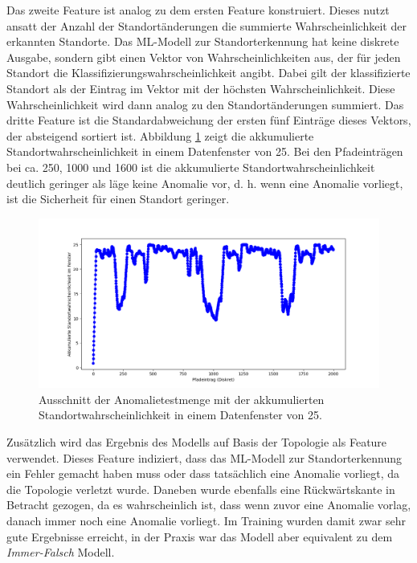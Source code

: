 \newline
\newline
Das zweite Feature ist analog zu dem ersten Feature konstruiert.
Dieses nutzt ansatt der Anzahl der Standortänderungen die summierte Wahrscheinlichkeit der erkannten Standorte.
Das ML-Modell zur Standorterkennung hat keine diskrete Ausgabe, sondern gibt einen Vektor von Wahrscheinlichkeiten aus,
der für jeden Standort die Klassifizierungswahrscheinlichkeit angibt.
Dabei gilt der klassifizierte Standort als der Eintrag im Vektor mit der höchsten Wahrscheinlichkeit.
Diese Wahrscheinlichkeit wird dann analog zu den Standortänderungen summiert.
Das dritte Feature ist die Standardabweichung der ersten fünf Einträge dieses Vektors, der absteigend sortiert ist.
Abbildung \ref{fig:window_confidence} zeigt die akkumulierte Standortwahrscheinlichkeit in einem Datenfenster von 25.
Bei den Pfadeinträgen bei ca. 250, 1000 und 1600 ist die akkumulierte Standortwahrscheinlichkeit deutlich geringer als läge keine Anomalie vor,
d. h. wenn eine Anomalie vorliegt, ist die Sicherheit für einen Standort geringer.
\begin{figure}[h!]
    \centering
    \includegraphics[width=\linewidth]{images/feature_window_confidence.png}
    \caption{Ausschnitt der Anomalietestmenge mit der akkumulierten Standortwahrscheinlichkeit in einem Datenfenster von 25.}
    \label{fig:window_confidence}
\end{figure}
\newline
\newline
Zusätzlich wird das Ergebnis des Modells auf Basis der Topologie als Feature verwendet.
Dieses Feature indiziert, dass das ML-Modell zur Standorterkennung ein Fehler gemacht haben muss
oder dass tatsächlich eine Anomalie vorliegt, da die Topologie verletzt wurde.
\newline
\newline
Daneben wurde ebenfalls eine Rückwärtskante in Betracht gezogen,
da es wahrscheinlich ist, dass wenn zuvor eine Anomalie vorlag, danach immer noch eine Anomalie vorliegt.
Im Training wurden damit zwar sehr gute Ergebnisse erreicht,
in der Praxis war das Modell aber equivalent zu dem \textit{Immer-Falsch} Modell.

